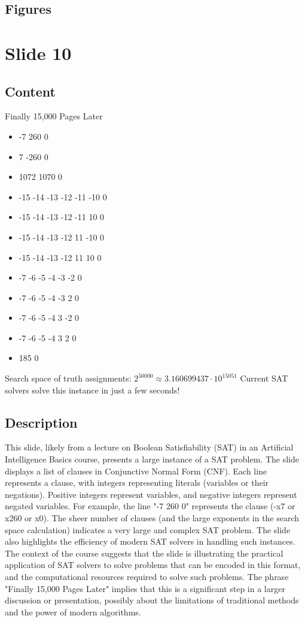 \documentclass{article}%
\begin{document}
\subsection{Figures}%
\begin{figure}[H]%
\centering%
\end{figure}

%
\newpage%
\section{Slide 10}%
\label{sec:Slide10}%
\subsection{Content}%

Finally 15,000 Pages Later
\begin{itemize}
    \item -7 260 0
    \item 7 -260 0
    \item 1072 1070 0
    \item -15 -14 -13 -12 -11 -10 0
    \item -15 -14 -13 -12 -11 10 0
    \item -15 -14 -13 -12 11 -10 0
    \item -15 -14 -13 -12 11 10 0
    \item -7 -6 -5 -4 -3 -2 0
    \item -7 -6 -5 -4 -3 2 0
    \item -7 -6 -5 -4 3 -2 0
    \item -7 -6 -5 -4 3 2 0
    \item 185 0
\end{itemize}
Search space of truth assignments:
$2^{50000} \approx 3.160699437 \cdot 10^{15051}$
Current SAT solvers solve this instance in just a few seconds!
%
\subsection{Description}%
This slide, likely from a lecture on Boolean Satisfiability (SAT) in an Artificial Intelligence Basics course, presents a large instance of a SAT problem.  The slide displays a list of clauses in Conjunctive Normal Form (CNF). Each line represents a clause, with integers representing literals (variables or their negations).  Positive integers represent variables, and negative integers represent negated variables.  For example, the line "-7 260 0" represents the clause (-x7 or x260 or x0).  The sheer number of clauses (and the large exponents in the search space calculation) indicates a very large and complex SAT problem.  The slide also highlights the efficiency of modern SAT solvers in handling such instances. The context of the course suggests that the slide is illustrating the practical application of SAT solvers to solve problems that can be encoded in this format, and the computational resources required to solve such problems. The phrase "Finally 15,000 Pages Later" implies that this is a significant step in a larger discussion or presentation, possibly about the limitations of traditional methods and the power of modern algorithms.%
\end{document}
